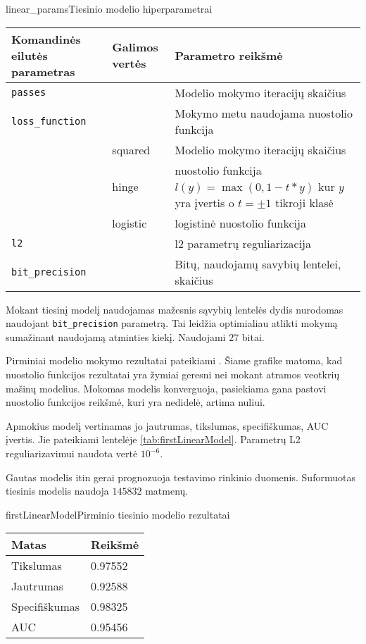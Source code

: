 \begin{ktutable}{linear_params}{Tiesinio modelio hiperparametrai}
    \begin{tabular}{| l | l | p{7cm}|}
    \hline
        Komandinės eilutės parametras & Galimos vertės & Parametro reikšmė\\ \hline
        \texttt{passes} &  & Modelio mokymo iteracijų skaičius \\ \hline
        \texttt{loss\_function} &          & Mokymo metu naudojama nuostolio funkcija \\
                               & squared  & Modelio mokymo iteracijų skaičius \\
                               & hinge    & nuostolio funkcija $l(y) = \max(0, 1 - t * y)$ kur $y$ yra įvertis o $t = \pm 1$ tikroji klasė  \\
                               & logistic & logistinė nuostolio funkcija \\ \hline
        \texttt{l2} & & l2 parametrų reguliarizacija \\ \hline
        \texttt{bit\_precision} & & Bitų, naudojamų savybių lentelei, skaičius\\ \hline
    \end{tabular}
\end{ktutable}

Mokant tiesinį modelį naudojamas mažesnis sąvybių lentelės dydis nurodomas naudojant \texttt{bit\_precision}
 parametrą. Tai leidžia optimialiau atlikti mokymą sumažinant naudojamą atminties kiekį. Naudojami $27$ bitai.

Pirminiai modelio mokymo rezultatai pateikiami . Šiame grafike
matoma, kad nuostolio funkcijos rezultatai yra žymiai geresni nei mokant atramos veotkrių mašinų
modelius. Mokomas modelis konverguoja, pasiekiama gana pastovi nuostolio funkcijos reikšmė, kuri
yra nedidelė, artima nuliui.


Apmokius modelį vertinamas jo jautrumas, tikslumas, specifiškumas, AUC įvertis. Jie pateikiami
lentelėje \vref{tab:firstLinearModel}. Parametrų L2 reguliarizavimui naudota vertė $10^{-6}$.

Gautas modelis itin gerai prognozuoja testavimo rinkinio duomenis. Suformuotas tiesinis modelis naudoja
$145832$ matmenų.

\begin{ktutable}{firstLinearModel}{Pirminio tiesinio modelio rezultatai}
    \begin{tabular}{| l | l |}
    \hline
       Matas & Reikšmė \\ \hline
               Tikslumas & 0.97552 \\ \hline
               Jautrumas & 0.92588 \\ \hline
               Specifiškumas & 0.98325 \\ \hline
               AUC & 0.95456 \\ \hline
    \end{tabular}
\end{ktutable}

